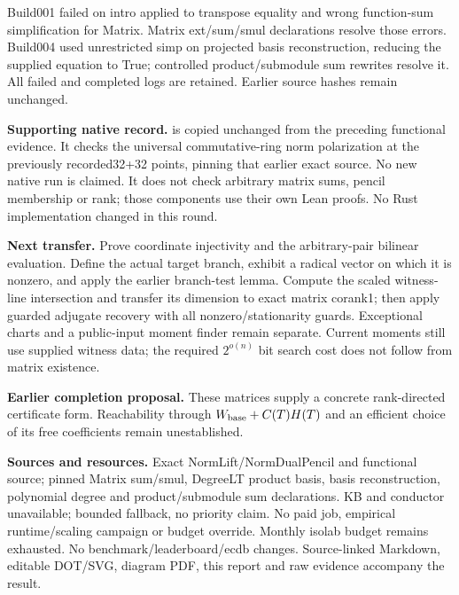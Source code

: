 \documentclass[11pt]{article}
\begin{document}
Build001 failed on intro applied to transpose equality and wrong function-sum
simplification for Matrix. Matrix ext/sum/smul declarations resolve those errors.
Build004 used unrestricted simp on projected basis reconstruction, reducing the
supplied equation to True; controlled product/submodule sum rewrites resolve
it. All failed and completed logs are retained. Earlier source hashes remain
unchanged.

\textbf{Supporting native record.}  is copied
unchanged from the preceding functional evidence. It checks the universal
commutative-ring norm polarization at the previously recorded32+32 points,
pinning that earlier exact source. No new native run is claimed. It does not
check arbitrary matrix sums, pencil membership or rank; those components use
their own Lean proofs. No Rust implementation changed in this round.

\textbf{Next transfer.} Prove coordinate injectivity and the arbitrary-pair
bilinear evaluation. Define the actual target branch, exhibit a radical vector
on which it is nonzero, and apply the earlier branch-test lemma. Compute the
scaled witness-line intersection and transfer its dimension to exact matrix
corank1; then apply guarded adjugate recovery with all nonzero/stationarity
guards. Exceptional charts and a public-input moment finder remain separate.
Current moments still use supplied witness data; the required $2^{o(n)}$ bit
search cost does not follow from matrix existence.

\textbf{Earlier completion proposal.} These matrices supply a concrete
rank-directed certificate form. Reachability through
$W_{\rm base}+C(T)H(T)$ and an efficient choice of its free coefficients remain
unestablished.

\textbf{Sources and resources.} Exact NormLift/NormDualPencil and functional
source; pinned Matrix sum/smul, DegreeLT product basis, basis reconstruction,
polynomial degree and product/submodule sum declarations. KB and conductor
unavailable; bounded fallback, no priority claim. No paid job, empirical
runtime/scaling campaign or budget override. Monthly isolab budget remains
exhausted. No benchmark/leaderboard/ecdb changes. Source-linked Markdown,
editable DOT/SVG, diagram PDF, this report and raw evidence accompany the result.
\end{document}
